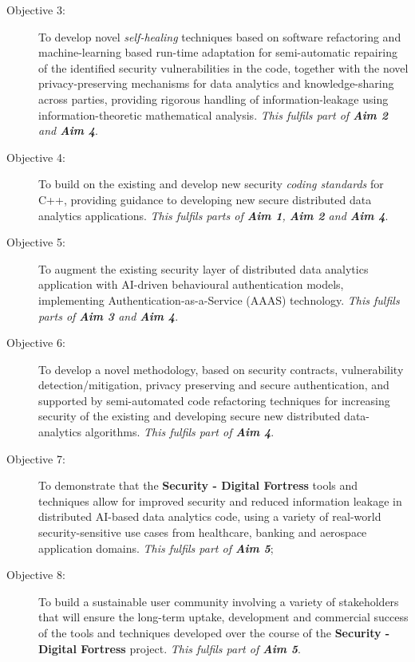 \documentclass[a4paper,11pt]{article}
\newcommand{\project}[1]{\textbf{#1}\xspace}
\newcommand{\SECURITY}{\project{Security - Digital Fortress}}
\newcommand{\TheProject}{\SECURITY}
\begin{document}
\begin{description}
\item[Objective 3:] To develop novel \emph{self-healing} techniques based on software refactoring and machine-learning based run-time adaptation for semi-automatic repairing of the identified security vulnerabilities in the code, together with the novel privacy-preserving mechanisms for data analytics and knowledge-sharing across parties, providing rigorous handling of information-leakage using information-theoretic mathematical analysis. \emph{This fulfils part of \textbf{Aim 2} and \textbf{Aim 4}}.

\item[Objective 4:] To build on the existing and develop new security \emph{coding standards} for C++, providing guidance to developing new secure distributed data analytics applications. \emph{This fulfils parts of \textbf{Aim 1}, \textbf{Aim 2} and \textbf{Aim 4}}.

\item[Objective 5:] To augment the existing security layer of distributed data analytics application with AI-driven behavioural authentication models, implementing Authentication-as-a-Service (AAAS) technology. \emph{This fulfils parts of \textbf{Aim 3} and \textbf{Aim 4}}.

\item[Objective 6:] To develop a novel methodology, based on security contracts, vulnerability detection/mitigation,
  privacy preserving and secure authentication, and supported by semi-automated code refactoring techniques for
  increasing security of the existing and developing secure new distributed data-analytics algorithms. \emph{This fulfils
    part of \textbf{Aim 4}}.

\item[Objective 7:] To demonstrate that the \TheProject{} tools and techniques allow for improved security and reduced
  information leakage in distributed AI-based data analytics code, using a variety of real-world security-sensitive
  use cases from healthcare, banking and aerospace application domains. \emph{This fulfils part of \textbf{Aim 5}};

\item[Objective 8:] To build a sustainable user community involving a variety of stakeholders that will ensure the long-term
  uptake, development and commercial success of the tools and techniques developed over the course of the \TheProject{}
  project. \emph{This fulfils part of \textbf{Aim 5}}.

\end{description}
\end{document}
